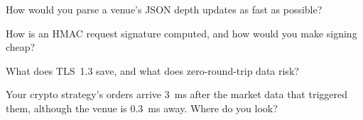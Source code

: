 \begin{interviewq}\label{iq:ll:websocket-rest-tls-and-json-at-speed:3}
How would you parse a venue's JSON depth updates as fast as possible?
\end{interviewq}

\begin{interviewq}\label{iq:ll:websocket-rest-tls-and-json-at-speed:4}
How is an HMAC request signature computed, and how would you make signing cheap?
\end{interviewq}

\begin{interviewq}\label{iq:ll:websocket-rest-tls-and-json-at-speed:5}
What does TLS~1.3  save, and what does zero-round-trip data risk?
\end{interviewq}

\begin{interviewq}\label{iq:ll:websocket-rest-tls-and-json-at-speed:6}
Your crypto strategy's orders arrive 3~ms after the market data that triggered them, although the venue is 0.3~ms away. Where
do you look?
\end{interviewq}
